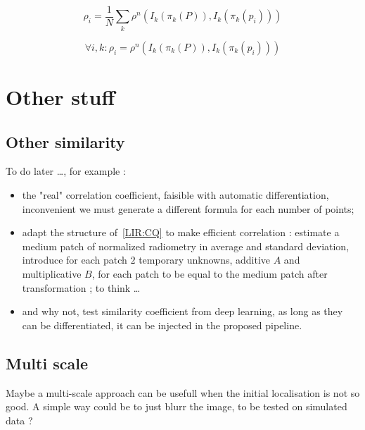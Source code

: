 \begin{equation}
     \rho_i = \frac{1}{N} \sum_k \rho^n(I_k(\pi_k(P)), I_k(\pi_k(p_i)))  \label{Eq:RIM:EstRho}
\end{equation}

\begin{equation}
      \forall i,k : \rho_i =  \rho^n(I_k(\pi_k(P)), I_k(\pi_k(p_i)))   \label{Eq:RIM:EqRho}
\end{equation}




\section{Other stuff}

\subsection{Other similarity}
\label{LIR:OthSim}

To do later \dots , for example :

\begin{itemize}
    \item the "real" correlation coefficient, faisible with automatic differentiation,
          inconvenient we must generate a different formula for each number of points;

    \item adapt the structure of~\ref{LIR:CQ} to make efficient correlation :
          estimate a medium   patch of normalized radiometry in average and standard deviation,
          introduce  for each patch $2$ temporary unknowns, additive $A$ and multiplicative $B$,
          for each patch to be equal to the medium patch after transformation ;
          to think \dots

    \item and why not, test similarity coefficient from deep learning, as long as they can
          be differentiated, it can be injected in the proposed pipeline.
\end{itemize}

\subsection{Multi scale}
Maybe a multi-scale approach can be usefull when the initial localisation is not so good. A simple
way could be to just blurr the image, to be tested on simulated data ?

